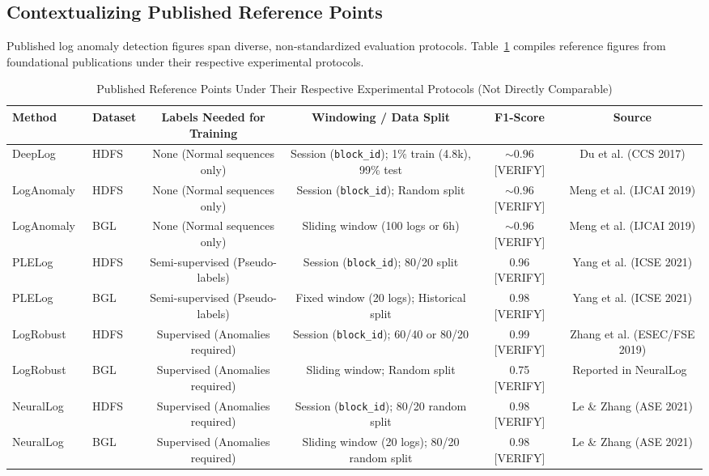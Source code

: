 \documentclass[conference]{IEEEtran}
\begin{document}
\subsection{Contextualizing Published Reference Points}
Published log anomaly detection figures span diverse, non-standardized evaluation protocols. Table~\ref{tab:published_reference_points} compiles reference figures from foundational publications under their respective experimental protocols.

\begin{table}[t]
\centering
\caption{Published Reference Points Under Their Respective Experimental Protocols (Not Directly Comparable)}
\label{tab:published_reference_points}
\begin{tabular}{llcccc}
\toprule
\textbf{Method} & \textbf{Dataset} & \textbf{Labels Needed for Training} & \textbf{Windowing / Data Split} & \textbf{F1-Score} & \textbf{Source} \\
\midrule
DeepLog~\cite{du2017deeplog} & HDFS & None (Normal sequences only) & Session (\texttt{block\_id}); 1\% train (4.8k), 99\% test & $\sim 0.96$ [VERIFY] & Du et al. (CCS 2017) \\
LogAnomaly~\cite{meng2019loganomaly} & HDFS & None (Normal sequences only) & Session (\texttt{block\_id}); Random split & $\sim 0.96$ [VERIFY] & Meng et al. (IJCAI 2019) \\
LogAnomaly~\cite{meng2019loganomaly} & BGL & None (Normal sequences only) & Sliding window (100 logs or 6h) & $\sim 0.96$ [VERIFY] & Meng et al. (IJCAI 2019) \\
PLELog~\cite{yang2021semi} & HDFS & Semi-supervised (Pseudo-labels) & Session (\texttt{block\_id}); 80/20 split & 0.96 [VERIFY] & Yang et al. (ICSE 2021) \\
PLELog~\cite{yang2021semi} & BGL & Semi-supervised (Pseudo-labels) & Fixed window (20 logs); Historical split & 0.98 [VERIFY] & Yang et al. (ICSE 2021) \\
LogRobust~\cite{zhang2019robust} & HDFS & Supervised (Anomalies required) & Session (\texttt{block\_id}); 60/40 or 80/20 & 0.99 [VERIFY] & Zhang et al. (ESEC/FSE 2019) \\
LogRobust~\cite{zhang2019robust} & BGL & Supervised (Anomalies required) & Sliding window; Random split & 0.75 [VERIFY] & Reported in NeuralLog~\cite{le2021log} \\
NeuralLog~\cite{le2021log} & HDFS & Supervised (Anomalies required) & Session (\texttt{block\_id}); 80/20 random split & 0.98 [VERIFY] & Le \& Zhang (ASE 2021) \\
NeuralLog~\cite{le2021log} & BGL & Supervised (Anomalies required) & Sliding window (20 logs); 80/20 random split & 0.98 [VERIFY] & Le \& Zhang (ASE 2021) \\
\bottomrule
\end{tabular}
\end{table}
\end{document}
